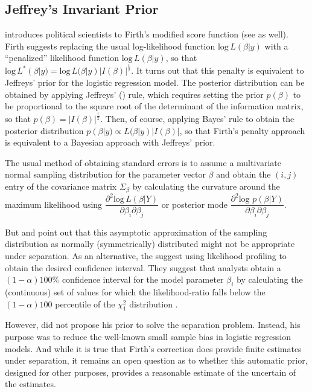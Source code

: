 \documentclass[12pt]{article}
\begin{document}
\subsection*{Jeffrey's Invariant Prior}

\cite{Zorn2005} introduces political scientists to Firth's \citeyear{Firth1993} modified score function (see \citealt{HeinzeSchemper2002} as well). Firth suggests replacing the usual log-likelihood function $\text{log}\,L(\beta | y)$ with a ``penalized'' likelihood function $\text{log}\,L(\beta | y)$, so that $\text{log}\,L^*(\beta | y) = \text{log}\,L(\beta | y)|I(\beta)|^\frac{1}{2}$. It turns out that this penalty is equivalent to Jeffreys' prior for the logistic regression model. The posterior distribution can be obtained by applying Jeffreys' (\citeyear{Jeffreys1946}) rule, which requires setting the prior $p(\beta)$ to be proportional to the square root of the determinant of the information matrix, so that $p(\beta) = |I(\beta)|^\frac{1}{2}$. Then, of course, applying Bayes' rule to obtain the posterior distribution $p(\beta | y) \propto L(\beta | y)|I(\beta)|$, so that Firth's penalty approach is equivalent to a Bayesian approach with Jeffreys' prior.

The usual method of obtaining standard errors is to assume a multivariate normal sampling distribution for the parameter vector $\beta$ and obtain the $(i, j)$ entry of the covariance matrix $\Sigma_\beta$ by calculating the curvature around the maximum likelihood using $\dfrac{\partial^2 \text{log}\,L(\beta | Y)}{\partial \beta_i \partial \beta_j}$ or posterior mode $\dfrac{\partial^2 \text{log}\,\,p(\beta | Y)}{\partial \beta_i \partial \beta_j}$. 

But \citep{HeinzeSchemper2002} and \cite{Zorn2005} point out that this asymptotic approximation of the sampling distribution as normally (symmetrically) distributed might not be appropriate under separation. As an alternative, the suggest using likelihood profiling to obtain the desired confidence interval. They suggest that analysts obtain a $(1 - \alpha)100\%$ confidence interval for the model parameter $\beta_i$ by calculating the (continuous) set of values for which the likelihood-ratio falls below the $(1 - \alpha)100$ percentile of the $\chi^2_1$ distribution \citep{HeinzeSchemper2002}.

However, \cite{Firth1993} did not propose his prior to solve the separation problem. Instead, his purpose was to reduce the well-known small sample bias in logistic regression models. And while it is true that Firth's correction does provide finite estimates under separation, it remains an open question as to whether this automatic prior, designed for other purposes, provides a reasonable estimate of the uncertain of the estimates.
\end{document}
